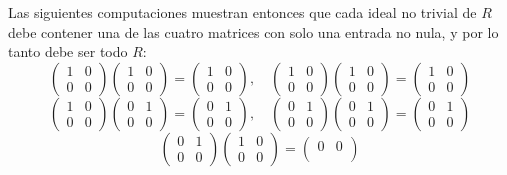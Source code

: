 \begin{enumerate}
Las siguientes computaciones muestran entonces que cada ideal no trivial de $R$ debe contener una de las cuatro matrices con solo una entrada no nula, y por lo tanto debe ser todo $R$:
\[
\begin{pmatrix}
1 & 0 \\
0 & 0
\end{pmatrix}
\begin{pmatrix}
1 & 0 \\
0 & 0
\end{pmatrix}
=
\begin{pmatrix}
1 & 0 \\
0 & 0
\end{pmatrix}
, \quad
\begin{pmatrix}
1 & 0 \\
0 & 0
\end{pmatrix}
\begin{pmatrix}
1 & 0 \\
0 & 0
\end{pmatrix}
=
\begin{pmatrix}
1 & 0 \\
0 & 0
\end{pmatrix}
\]
\[
\begin{pmatrix}
1 & 0 \\
0 & 0
\end{pmatrix}
\begin{pmatrix}
0 & 1 \\
0 & 0
\end{pmatrix}
=
\begin{pmatrix}
0 & 1 \\
0 & 0
\end{pmatrix}
, \quad
\begin{pmatrix}
0 & 1 \\
0 & 0
\end{pmatrix}
\begin{pmatrix}
0 & 1 \\
0 & 0
\end{pmatrix}
=
\begin{pmatrix}
0 & 1 \\
0 & 0
\end{pmatrix}
\]
\[
\begin{pmatrix}
0 & 1 \\
0 & 0
\end{pmatrix}
\begin{pmatrix}
1 & 0 \\
0 & 0
\end{pmatrix}
=
\begin{pmatrix}
0 & 0 \\

\end{pmatrix}\]
\end{enumerate}
